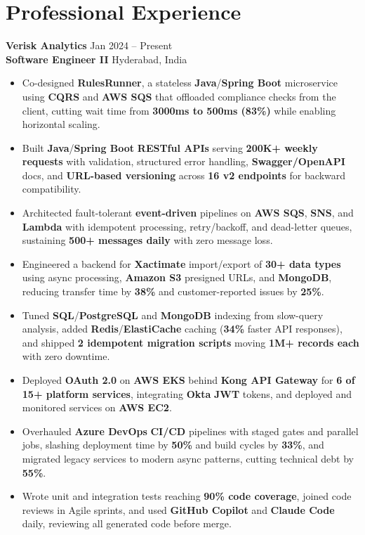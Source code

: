 \documentclass[a4paper,10pt]{article}
\begin{document}
\section*{Professional Experience}

\textbf{Verisk Analytics} \hfill Jan 2024 -- Present \\
\textbf{Software Engineer II} \hfill Hyderabad, India

\begin{itemize}[leftmargin=*]
    \item Co-designed \textbf{RulesRunner}, a stateless \textbf{Java}/\textbf{Spring Boot} microservice using \textbf{CQRS} and \textbf{AWS SQS} that offloaded compliance checks from the client, cutting wait time from \textbf{3000ms to 500ms (83\%)} while enabling horizontal scaling.
    \item Built \textbf{Java}/\textbf{Spring Boot} \textbf{RESTful APIs} serving \textbf{200K+ weekly requests} with validation, structured error handling, \textbf{Swagger/OpenAPI} docs, and \textbf{URL-based versioning} across \textbf{16 v2 endpoints} for backward compatibility.
    \item Architected fault-tolerant \textbf{event-driven} pipelines on \textbf{AWS SQS}, \textbf{SNS}, and \textbf{Lambda} with idempotent processing, retry/backoff, and dead-letter queues, sustaining \textbf{500+ messages daily} with zero message loss.
    \item Engineered a backend for \textbf{Xactimate} import/export of \textbf{30+ data types} using async processing, \textbf{Amazon S3} presigned URLs, and \textbf{MongoDB}, reducing transfer time by \textbf{38\%} and customer-reported issues by \textbf{25\%}.
    \item Tuned \textbf{SQL}/\textbf{PostgreSQL} and \textbf{MongoDB} indexing from slow-query analysis, added \textbf{Redis}/\textbf{ElastiCache} caching (\textbf{34\%} faster API responses), and shipped \textbf{2 idempotent migration scripts} moving \textbf{1M+ records each} with zero downtime.
    \item Deployed \textbf{OAuth 2.0} on \textbf{AWS EKS} behind \textbf{Kong API Gateway} for \textbf{6 of 15+ platform services}, integrating \textbf{Okta} \textbf{JWT} tokens, and deployed and monitored services on \textbf{AWS EC2}.
    \item Overhauled \textbf{Azure DevOps} \textbf{CI/CD} pipelines with staged gates and parallel jobs, slashing deployment time by \textbf{50\%} and build cycles by \textbf{33\%}, and migrated legacy services to modern async patterns, cutting technical debt by \textbf{55\%}.
    \item Wrote unit and integration tests reaching \textbf{90\% code coverage}, joined code reviews in Agile sprints, and used \textbf{GitHub Copilot} and \textbf{Claude Code} daily, reviewing all generated code before merge.
\end{itemize}
\end{document}
